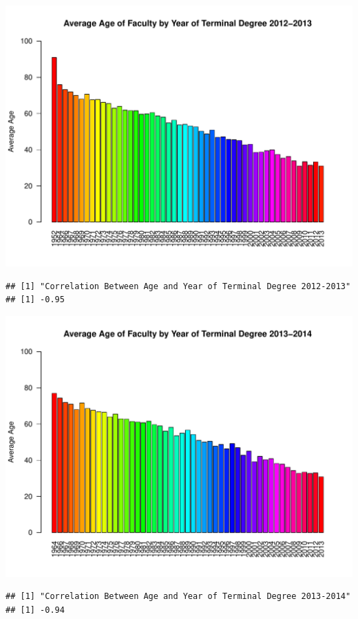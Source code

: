 \documentclass[12pt,a4paper]{article}\usepackage[]{graphicx}\usepackage[]{color}
\makeatletter
\def\maxwidth{ %
  \ifdim\Gin@nat@width>\linewidth
    \linewidth
  \else
    \Gin@nat@width
  \fi
}
\newenvironment{kframe}{%
 \def\at@end@of@kframe{}%
 \ifinner\ifhmode%
  \def\at@end@of@kframe{\end{minipage}}%
  \begin{minipage}{\columnwidth}%
 \fi\fi%
 \def\FrameCommand##1{\hskip\@totalleftmargin \hskip-\fboxsep
 \colorbox{shadecolor}{##1}\hskip-\fboxsep
     \hskip-\linewidth \hskip-\@totalleftmargin \hskip\columnwidth}%
 \MakeFramed {\advance\hsize-\width
   \@totalleftmargin\z@ \linewidth\hsize
   \@setminipage}}%
 {\par\unskip\endMakeFramed%
 \at@end@of@kframe}
\newenvironment{knitrout}{}{} %
\theoremstyle{definition}
\makeatother
\begin{document}
\begin{knitrout}
\begin{kframe}
\end{kframe}
\includegraphics[width=\maxwidth]{figure/unnamed-chunk-12-9} 
\begin{kframe}\begin{verbatim}
## [1] "Correlation Between Age and Year of Terminal Degree 2012-2013"
## [1] -0.95
\end{verbatim}
\end{kframe}
\includegraphics[width=\maxwidth]{figure/unnamed-chunk-12-10} 
\begin{kframe}\begin{verbatim}
## [1] "Correlation Between Age and Year of Terminal Degree 2013-2014"
## [1] -0.94
\end{verbatim}
\end{kframe}
\end{knitrout}
\end{document}
